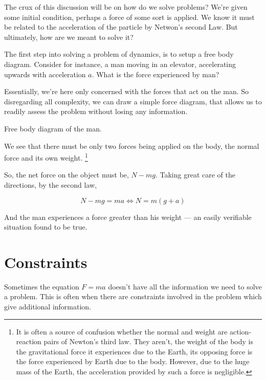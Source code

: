 The crux of this discussion will be on how do we solve problems? We're given 
some initial condition, perhaps a force of some sort is applied. We know it must be 
related to the acceleration of the particle by Netwon's second Law. But ultimately, how are 
we meant to solve it?

The first step into solving a problem of dynamics, is to setup a free body diagram.
Consider for instance, a man moving in an elevator, accelerating upwards with acceleration 
\(a\). What is the force experienced by man?

Essentially, we're here only concerned with the forces that act on the man. So disregarding
all complexity, we can draw a simple force diagram, that allows us to readily assess 
the problem without losing any information.

\begin{marginfigure}
    \caption{Free body diagram of the man.}
\end{marginfigure}

We see that there must be only two forces being applied on the body,
the normal force and its own weight. \footnote{It is often a source of 
confusion whether the normal and weight are action-reaction pairs of Newton's third law.
They aren't, the weight of the body is the gravitational force it experiences 
due to the Earth, its opposing force is the force experienced by Earth due to the body.
However, due to the huge mass of the Earth, the acceleration provided by such a force is 
negligible.}

So, the net force on the object must be, \(N - mg\). Taking great care of the directions, 
by the second law,

\begin{equation*}
    N - mg = ma \iff N = m(g + a)
\end{equation*}

And the man experiences a force greater than his weight --- an easily verifiable situation found 
to be true.

\section{Constraints}

Sometimes the equation \(F = ma\) doesn't have all the information we need to solve a 
problem. This is often when there are constraints involved in the problem which give 
additional information.

